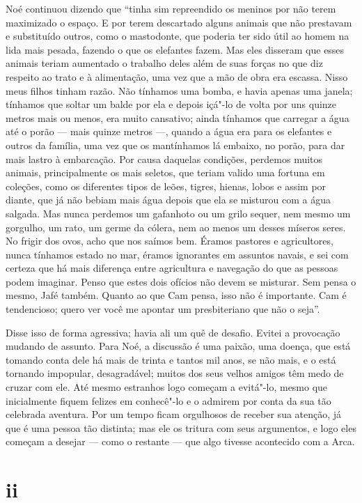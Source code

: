 Noé continuou dizendo que “tinha sim repreendido os meninos por não terem
maximizado o espaço. E por terem descartado alguns animais que não
prestavam e substituído outros, como o mastodonte, que poderia ter sido útil ao
homem na lida mais pesada, fazendo o que os elefantes fazem. Mas eles disseram que
esses animais teriam aumentado o trabalho deles além de suas forças no que diz
respeito ao trato e à alimentação, uma vez que a mão de obra era escassa.
Nisso meus filhos tinham razão. Não tínhamos uma bomba, e havia apenas uma janela;
tínhamos que soltar um balde por ela e depois içá"-lo de volta por uns quinze metros
mais ou menos, era muito cansativo; ainda tínhamos que carregar a
água até o porão --- mais quinze metros ---, quando a água era para os elefantes e
outros da família, uma vez que os mantínhamos lá embaixo, no porão, para dar mais
lastro à embarcação. Por causa daquelas condições, perdemos muitos animais,
principalmente os mais seletos, que teriam valido uma fortuna em coleções, como os
diferentes tipos de leões, tigres, hienas, lobos e assim por diante, que já não
bebiam mais água depois que ela se misturou com a água salgada. Mas nunca
perdemos um gafanhoto ou um grilo sequer, nem mesmo um gorgulho, um rato, um germe
da cólera, nem ao menos um desses míseros seres. No frigir dos ovos, acho que nos
saímos bem. Éramos pastores e agricultores, nunca tínhamos estado no mar,
éramos ignorantes em assuntos navais, e sei com certeza que há mais
diferença entre agricultura e navegação do que as pessoas podem imaginar. Penso que
estes dois ofícios não devem se misturar. Sem pensa o mesmo, Jafé
também. Quanto ao que Cam pensa, isso não é importante. Cam é tendencioso; 
quero ver você me apontar um presbiteriano que não o seja”.     

Disse isso de forma agressiva; havia ali um quê de desafio. Evitei a
provocação mudando de assunto. Para Noé, a discussão é uma paixão, uma doença, que
está tomando conta dele há mais de trinta e tantos mil anos, se não mais, e o está
tornando impopular, desagradável; muitos dos seus velhos amigos têm medo de
cruzar com ele. Até mesmo estranhos logo começam a evitá"-lo, mesmo que
inicialmente fiquem felizes em conhecê"-lo e o admirem por conta da sua tão
celebrada aventura. Por um tempo ficam orgulhosos de receber sua atenção, já que
é uma pessoa tão distinta; mas ele os tritura com seus argumentos, e logo eles começam
a desejar --- como o restante --- que algo tivesse acontecido com a Arca.

\section*{ii}

